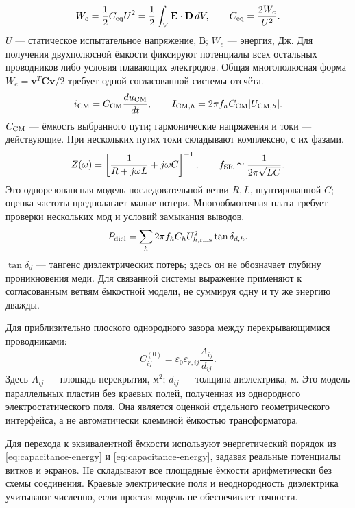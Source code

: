 \documentclass[14pt,a4paper]{extarticle}
\begin{document}
\begin{equation}
 W_e=\frac12 C_{\rm eq}U^2=\frac12\int_V\mathbf E\cdot\mathbf D\,dV,
 \qquad C_{\rm eq}=\frac{2W_e}{U^2}.
 \label{eq:capacitance-energy}
\end{equation}
$U$ --- статическое испытательное напряжение, В; $W_e$ --- энергия, Дж. Для получения двухполюсной ёмкости фиксируют потенциалы всех остальных проводников либо условия плавающих электродов. Общая многополюсная форма $W_e=\mathbf v^T\mathbf C\mathbf v/2$ требует одной согласованной системы отсчёта.
\begin{equation}
 i_{\rm CM}=C_{\rm CM}\frac{du_{\rm CM}}{dt},\qquad
 I_{{\rm CM},h}=2\pi f_h C_{\rm CM}|U_{{\rm CM},h}|.
 \label{eq:common-mode-current}
\end{equation}
$C_{\rm CM}$ --- ёмкость выбранного пути; гармонические напряжения и токи --- действующие. При нескольких путях токи складывают комплексно, с их фазами.
\begin{equation}
 Z(\omega)=\left[\frac1{R+j\omega L}+j\omega C\right]^{-1},\qquad
 f_{\rm SR}\simeq\frac1{2\pi\sqrt{LC}}.
 \label{eq:impedance}
\end{equation}
Это однорезонансная модель последовательной ветви $R,L$, шунтированной $C$; оценка частоты предполагает малые потери. Многообмоточная плата требует проверки нескольких мод и условий замыкания выводов.
\begin{equation}
 P_{\rm diel}=\sum_h 2\pi f_h C_h U_{h,\rm rms}^2\tan\delta_{d,h}.
 \label{eq:dielectric-loss-independent}
\end{equation}
$\tan\delta_d$ --- тангенс диэлектрических потерь; здесь он не обозначает глубину проникновения меди. Для связанной системы выражение применяют к согласованным ветвям ёмкостной модели, не суммируя одну и ту же энергию дважды.

Для приблизительно плоского однородного зазора между перекрывающимися проводниками:
\begin{equation}
 C_{ij}^{(0)}=\varepsilon_0\varepsilon_{r,ij}\frac{A_{ij}}{d_{ij}}.
 \label{pl:eq:plate-capacitance}
\end{equation}
Здесь $A_{ij}$ --- площадь перекрытия, м$^2$; $d_{ij}$ --- толщина диэлектрика, м. Это модель параллельных пластин без краевых полей, полученная из однородного электростатического поля. Она является оценкой отдельного геометрического интерфейса, а не автоматически клеммной ёмкостью трансформатора.

Для перехода к эквивалентной ёмкости используют энергетический порядок из \eqref{eq:capacitance-energy} и \eqref{eq:capacitance-energy}, задавая реальные потенциалы витков и экранов. Не складывают все площадные ёмкости арифметически без схемы соединения. Краевые электрические поля и неоднородность диэлектрика учитывают численно, если простая модель не обеспечивает точности.\cite{zhaocap}
\end{document}
